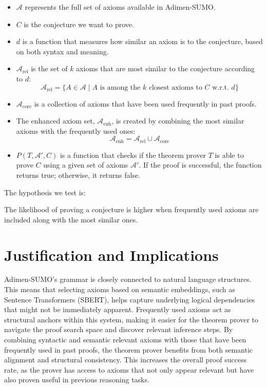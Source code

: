 \documentclass[english,version-2020-11]{uzl-thesis}
\begin{document}
\begin{itemize}
    \item \( \mathcal{A} \) represents the full set of axioms available in Adimen-SUMO.
    \item \( C \) is the conjecture we want to prove.
    \item \( d \) is a function that measures how similar an axiom is to the conjecture, based on both syntax and meaning.
    \item \( \mathcal{A}_{\text{rel}} \) is the set of \( k \) axioms that are most similar to the conjecture according to \( d \):
    \begin{equation}
        \mathcal{A}_{\text{rel}} = \{ A \in \mathcal{A} \mid A \text{ is among the } k \text{ closest axioms to } C \text{ w.r.t. } d \}
    \end{equation}
    \item \( \mathcal{A}_{\text{core}} \) is a collection of axioms that have been used frequently in past proofs.
    \item The enhanced axiom set, \( \mathcal{A}_{\text{enh}} \), is created by combining the most similar axioms with the frequently used ones:
    \begin{equation}
        \mathcal{A}_{\text{enh}} = \mathcal{A}_{\text{rel}} \cup \mathcal{A}_{\text{core}}
    \end{equation}
    \item \( P(T, \mathcal{A}', C) \) is a function that checks if the theorem prover \( T \) is able to prove \( C \) using a given set of axioms \( \mathcal{A}' \). If the proof is successful, the function returns true; otherwise, it returns false.
\end{itemize}

The hypothesis we test is:

The likelihood of proving a conjecture is higher when frequently used axioms are included along with the most similar ones.


\section{Justification and Implications}

Adimen-SUMO's grammar is closely connected to natural language structures.
This means that selecting axioms based on semantic embeddings, such as Sentence Transformers (SBERT), helps capture underlying logical dependencies that might not be immediately apparent. Frequently used axioms act as structural anchors within this system, making it easier for the theorem prover to navigate the proof search space and discover relevant inference steps.
By combining syntactic and semantic relevant axioms with those that have been frequently used in past proofs, the theorem prover benefits from both semantic alignment and structural consistency. This increases the overall proof success rate, as the prover has access to axioms that not only appear relevant but have also proven useful in previous reasoning tasks.
\end{document}
